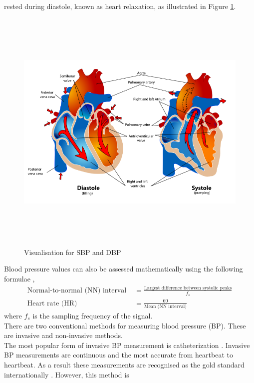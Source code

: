 rested during  diastole, known as heart  relaxation, as illustrated in Figure \ref{diastoleSystole}. \begin{figure}[H]
    \centering
    \includegraphics[width=12cm,height=12cm,keepaspectratio]{Background/sbp_dbp.png}
    \caption{Visualisation for SBP and DBP \cite{SBP}}
    \label{diastoleSystole}
\end{figure}\noindent Blood pressure values can also be assessed mathematically using the following formulae \cite{Shaffer2017},
\begin{align}
    \text{Normal-to-normal (NN) interval } &= \frac{\text{Largest difference between systolic peaks}}{f_s}\\
    \text{Heart rate (HR) } &= \frac{60}{\text{Mean (NN interval)}} 
\end{align}\noindent where $f_s$ is the sampling frequency of the signal. \\ \newline \noindent There 
are two  conventional  methods  for  measuring  blood  pressure (BP). These 
are invasive   and   non-invasive methods. \\ \newline \noindent  The most popular form of invasive  BP 
measurement is  catheterization \cite{Zaki2018}. Invasive BP measurements 
are continuous and the most accurate from heartbeat to heartbeat. As a result 
these measurements are recognised as the gold standard 
internationally \cite{Sharma2017} \cite{ElHajj2020}. However, this method is 
